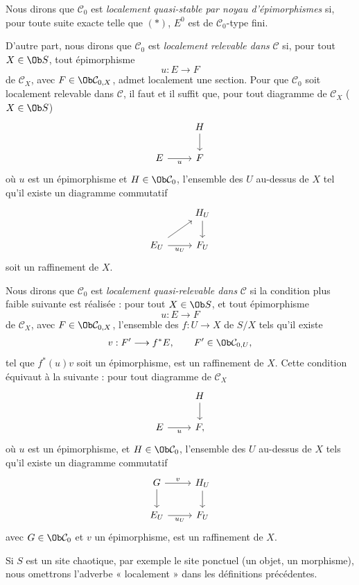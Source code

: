 \documentclass[11pt]{article}
\begin{document}
Nous dirons que \(\mathcal C_0\) est \emph{localement quasi-stable par noyau d'épimorphismes} si, pour toute suite exacte telle que \((*)\), \(E^0\) est de \(\mathcal C_0\)-type fini.

D'autre part, nous dirons que \(\mathcal C_0\) est \emph{localement relevable dans} \(\mathcal C\) si, pour tout \(X\in\Ob S\), tout épimorphisme
\[
  u:E\longrightarrow F
\]
de \(\mathcal C_X\), avec \(F\in\Ob\mathcal C_{0,X}\), admet localement une section. Pour que \(\mathcal C_0\) soit localement relevable dans \(\mathcal C\), il faut et il suffit que, pour tout diagramme de \(\mathcal C_X\) (\(X\in\Ob S\))
\[
\begin{tikzcd}
& H \arrow[d]\\
E \arrow[r,"u"'] & F
\end{tikzcd}
\]
où \(u\) est un épimorphisme et \(H\in\Ob\mathcal C_0\), l'ensemble des \(U\) au-dessus de \(X\) tel qu'il existe un diagramme commutatif
\[
\begin{tikzcd}
& H_U \arrow[d]\\
E_U \arrow[r,"u_U"'] \arrow[ur] & F_U
\end{tikzcd}
\]
soit un raffinement de \(X\).

Nous dirons que \(\mathcal C_0\) est \emph{localement quasi-relevable dans} \(\mathcal C\) si la condition plus faible suivante est réalisée : pour tout \(X\in\Ob S\), et tout épimorphisme
\[
  u:E\longrightarrow F
\]
de \(\mathcal C_X\), avec \(F\in\Ob\mathcal C_{0,X}\), l'ensemble des \(f:U\to X\) de \(S/X\) tels qu'il existe
\[
  v:F'\longrightarrow f^*E,\qquad F'\in\Ob\mathcal C_{0,U},
\]
tel que \(f^*(u)v\) soit un épimorphisme, est un raffinement de \(X\). Cette condition équivaut à la suivante : pour tout diagramme de \(\mathcal C_X\)
\[
\begin{tikzcd}
& H \arrow[d]\\
E \arrow[r,"u"'] & F ,
\end{tikzcd}
\]
où \(u\) est un épimorphisme, et \(H\in\Ob\mathcal C_0\), l'ensemble des \(U\) au-dessus de \(X\) tels qu'il existe un diagramme commutatif
\[
\begin{tikzcd}
G \arrow[r,"v"] \arrow[d] & H_U \arrow[d]\\
E_U \arrow[r,"u_U"'] & F_U
\end{tikzcd}
\]
avec \(G\in\Ob\mathcal C_0\) et \(v\) un épimorphisme, est un raffinement de \(X\).

Si \(S\) est un site chaotique, par exemple le site ponctuel (un objet, un morphisme), nous omettrons l'adverbe « localement » dans les définitions précédentes.
\end{document}

